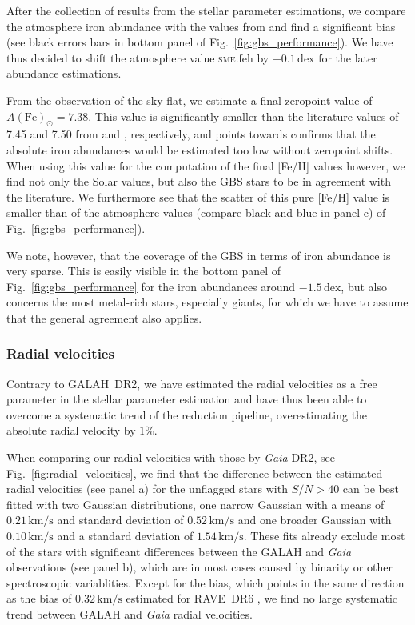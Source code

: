 \documentclass[fleqn,usenatbib,useAMS]{mnras}
\newcommand{\Gaia}{\textit{Gaia}\xspace}
\begin{document}
After the collection of results from the stellar parameter estimations, we compare the atmosphere iron abundance with the values from \citet{Jofre2018a} and find a significant bias (see black errors bars in bottom panel of Fig.~\ref{fig:gbs_performance}). We have thus decided to shift the atmosphere value \textsc{sme}.feh by $+0.1\,\mathrm{dex}$ for the later abundance estimations.

From the observation of the sky flat, we estimate a final zeropoint value of $A(\mathrm{Fe})_\odot = 7.38$. This value is significantly smaller than the literature values of 7.45 and 7.50 from \citet{Grevesse2007} and \citet{Asplund2009}, respectively, and points towards confirms that the absolute iron abundances would be estimated too low without zeropoint shifts. When using this value for the computation of the final [Fe/H] values however, we find not only the Solar values, but also the GBS stars to be in agreement with the literature. We furthermore see that the scatter of this pure [Fe/H] value is smaller than of the atmosphere values (compare black and blue in panel c) of Fig.~\ref{fig:gbs_performance}).

We note, however, that the coverage of the GBS in terms of iron abundance is very sparse. This is easily visible in the bottom panel of Fig.~\ref{fig:gbs_performance} for the iron abundances around $-1.5\,\mathrm{dex}$, but also concerns the most metal-rich stars, especially giants, for which we have to assume that the general agreement also applies.

\subsubsection{Radial velocities}

Contrary to GALAH~DR2, we have estimated the radial velocities as a free parameter in the stellar parameter estimation and have thus been able to overcome a systematic trend of the reduction pipeline, overestimating the absolute radial velocity by $1\%$.

When comparing our radial velocities with those by \Gaia DR2, see Fig.~\ref{fig:radial_velocities}, we find that the difference between the estimated radial velocities (see panel a) for the unflagged stars with $S/N > 40$ can be best fitted with two Gaussian distributions, one narrow Gaussian with a means of $0.21\,\mathrm{km/s}$ and standard deviation of $0.52\,\mathrm{km/s}$ and one broader Gaussian with $0.10\,\mathrm{km/s}$ and a standard deviation of $1.54\,\mathrm{km/s}$. These fits already exclude most of the stars with significant differences between the GALAH and \Gaia observations (see panel b), which are in most cases caused by binarity or other spectroscopic variablities. Except for the bias, which points in the same direction as the bias of $0.32\,\mathrm{km/s}$ estimated for RAVE~DR6 \citep{Steinmetz2020a}, we find no large systematic trend between GALAH and \Gaia radial velocities.
\end{document}
